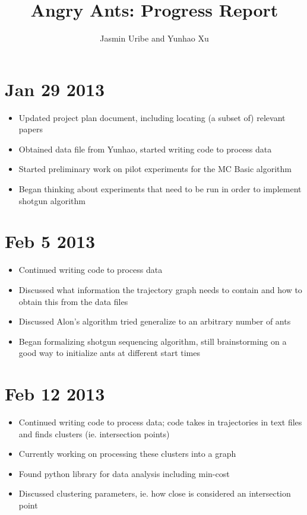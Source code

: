 \documentclass[12pt]{article}
\begin{document}
\title{Angry Ants: Progress Report}
\author{Jasmin Uribe and Yunhao Xu}
\maketitle
\section{Jan 29 2013}
\begin{itemize}
\item Updated project plan document, including locating (a subset of) relevant papers
\item Obtained data file from Yunhao, started writing code to process data
\item Started preliminary work on pilot experiments for the MC Basic algorithm
\item Began thinking about experiments that need to be run in order to implement shotgun algorithm
\end{itemize}

\section{Feb 5 2013}
\begin{itemize}
\item Continued writing code to process data
\item Discussed what information the trajectory graph needs to contain and how to obtain this from the data files
\item Discussed Alon's algorithm tried generalize to an arbitrary number of ants
\item Began formalizing shotgun sequencing algorithm, still brainstorming on a good way to initialize ants at different start times
\end{itemize}

\section{Feb 12 2013}
\begin{itemize}
\item Continued writing code to process data; code takes in trajectories in text files and finds clusters (ie. intersection points)
\item Currently working on processing these clusters into a graph 
\item Found python library for data analysis including min-cost
\item Discussed clustering parameters, ie. how close is considered an intersection point
\end{itemize}
\end{document}
